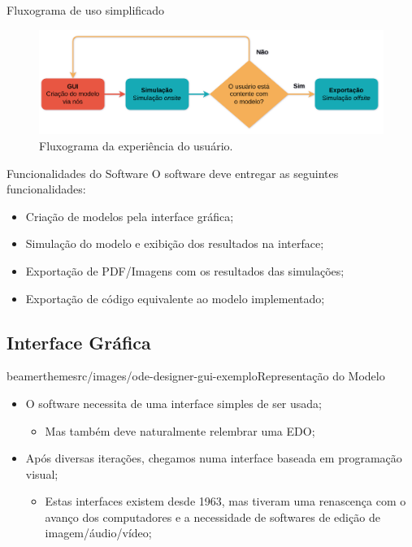 \begin{frame}{Fluxograma de uso simplificado}
    \begin{figure}
        \centering
        \includegraphics[width=\textwidth, height=\textheight, keepaspectratio=true]{beamerthemesrc/images/ode-designer-fluxograma.png}
        \caption{Fluxograma da experiência do usuário.}
    \end{figure}
\end{frame}

\begin{frame}{Funcionalidades do Software}
    O software deve entregar as seguintes funcionalidades:
    \begin{itemize}
        \item Criação de modelos pela interface gráfica;
        \item Simulação do modelo e exibição dos resultados na interface;
        \item Exportação de PDF/Imagens com os resultados das simulações;
        \item Exportação de código equivalente ao modelo implementado;
    \end{itemize}
\end{frame}

\subsection{Interface Gráfica}

\begin{sidepic}{beamerthemesrc/images/ode-designer-gui-exemplo}{Representação do Modelo}
    \begin{itemize}
        \item O software necessita de uma interface simples de ser usada;
            \begin{itemize}
                \item Mas também deve naturalmente relembrar uma EDO;
            \end{itemize}
        \item Após diversas iterações, chegamos numa interface baseada em programação visual;
            \begin{itemize}
                \item Estas interfaces existem desde 1963, mas tiveram uma renascença com o avanço dos computadores e a necessidade de softwares de edição de imagem/áudio/vídeo;
            \end{itemize}
    \end{itemize}
\end{sidepic}


